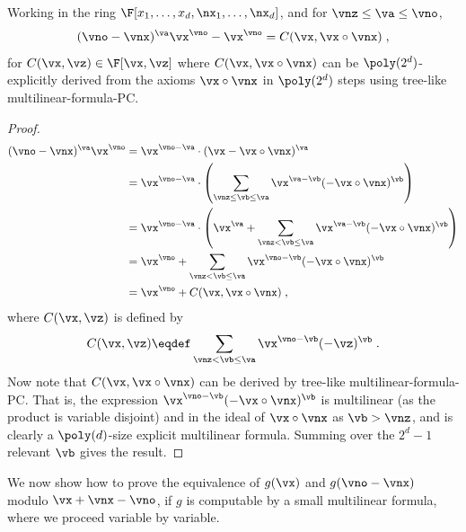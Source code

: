 \documentclass{toc}
\begin{document}
\begin{lemma}\label{res:mult-form-PC:mon-mon}
        Working in the ring $\F[x_1,\ldots,x_d,\nx_1,\ldots,\nx_d]$, and for $\vnz\le\va\le \vno$,
        \[
                (\vno-\vnx)^\va\vx^\vno-\vx^\vno
                =C(\vx,\vx\circ\vnx)
                \;,
        \]
        for $C(\vx,\vz)\in\F[\vx,\vz]$ where $C(\vx,\vx\circ\vnx)$ can be $\poly(2^d)$-explicitly derived from the axioms $\vx\circ\vnx$ in $\poly(2^d)$ steps using tree-like multilinear-formula-PC.
\end{lemma}
\begin{proof}
        \begin{align*}
                (\vno-\vnx)^\va\vx^\vno
                &=\vx^{\vno-\va}\cdot (\vx-\vx\circ\vnx)^\va\\
                &=\vx^{\vno-\va}\cdot \left(\sum_{\vnz\le\vb\le\va} \vx^{\va-\vb}(-\vx\circ\vnx)^{\vb}\right)\\
                &=\vx^{\vno-\va}\cdot \left(\vx^\va+\sum_{\vnz<\vb\le\va} \vx^{\va-\vb}(-\vx\circ\vnx)^{\vb}\right)\\
                &=\vx^\vno+\sum_{\vnz<\vb\le\va} \vx^{\vno-\vb}(-\vx\circ\vnx)^{\vb}\\
                &=\vx^\vno+C(\vx,\vx\circ\vnx)
                \;,
        \end{align*}
        where $C(\vx,\vz)$ is defined by
        \[
                C(\vx,\vz)\eqdef\sum_{\vnz<\vb\le\va} \vx^{\vno-\vb}(-\vz)^{\vb}
                \;.
        \]
        Now note that $C(\vx,\vx\circ\vnx)$ can be derived by tree-like multilinear-formula-PC\@.  That is, the expression $\vx^{\vno-\vb}(-\vx\circ\vnx)^{\vb}$ is multilinear (as the product is variable disjoint) and in the ideal of $\vx\circ\vnx$ as $\vb>\vnz$, and is clearly a $\poly(d)$-size explicit multilinear formula. Summing over the $2^d-1$ relevant $\vb$ gives the result.
\end{proof}

We now show how to prove the equivalence of $g(\vx)$ and $g(\vno-\vnx)$ modulo $\vx+\vnx-\vno$, if $g$ is computable by a small multilinear formula, where we proceed variable by variable.
\end{document}
